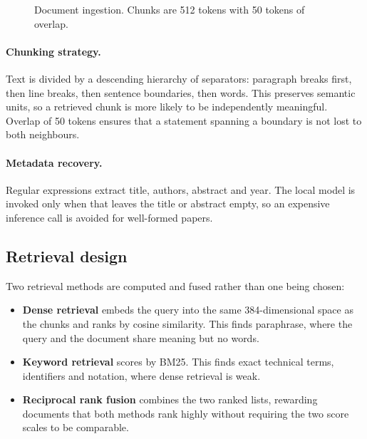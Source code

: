\documentclass[11pt,a4paper]{article}
\begin{document}
\begin{figure}[H]
\centering
{}
\caption{Document ingestion. Chunks are 512 tokens with 50 tokens of overlap.}
\end{figure}

\paragraph{Chunking strategy.} Text is divided by a descending hierarchy of
separators: paragraph breaks first, then line breaks, then sentence boundaries,
then words. This preserves semantic units, so a retrieved chunk is more likely
to be independently meaningful. Overlap of 50 tokens ensures that a statement
spanning a boundary is not lost to both neighbours.

\paragraph{Metadata recovery.} Regular expressions extract title, authors,
abstract and year. The local model is invoked only when that leaves the title or
abstract empty, so an expensive inference call is avoided for well-formed
papers.

\subsection{Retrieval design}

Two retrieval methods are computed and fused rather than one being chosen:

\begin{itemize}[leftmargin=*]
  \item \textbf{Dense retrieval} embeds the query into the same 384-dimensional
        space as the chunks and ranks by cosine similarity. This finds
        paraphrase, where the query and the document share meaning but no words.
  \item \textbf{Keyword retrieval} scores by BM25. This finds exact technical
        terms, identifiers and notation, where dense retrieval is weak.
  \item \textbf{Reciprocal rank fusion} combines the two ranked lists, rewarding
        documents that both methods rank highly without requiring the two score
        scales to be comparable.
\end{itemize}
\end{document}
